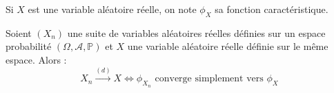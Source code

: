 





  \begin{notation}
    Si $X$ est une variable aléatoire réelle, on note $\phi_X$ sa fonction caractéristique.
  \end{notation}


  \begin{theorem}
    \label{theoreme-central-limite-1}
    Soient $(X_n)$ une suite de variables aléatoires réelles définies sur un espace probabilité $(\Omega, \mathcal{A}, \mathbb{P})$ et $X$ une variable aléatoire réelle définie sur le même espace. Alors :
    \[ X_n \overset{(d)}{\longrightarrow} X \iff \phi_{X_n} \text{ converge simplement vers } \phi_X \]
  \end{theorem}

